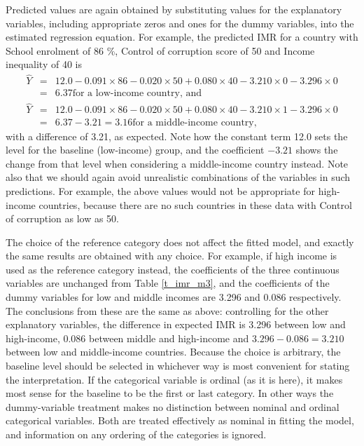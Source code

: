 Predicted values are again obtained by substituting values for the
explanatory variables, including appropriate zeros and ones for the
dummy variables, into the estimated regression equation. For example,
the predicted IMR for a country with
School enrolment of 86 \%,
Control of corruption score of 50 and
Income inequality of 40 is
\begin{eqnarray*}
\hat{Y}&=&12.0-0.091\times 86-0.020\times 50+0.080\times 40-3.210\times
0-3.296\times 0\\
&=&
6.37 \text{for a low-income country, and }\\
\hat{Y}&=&12.0-0.091\times 86-0.020\times 50+0.080\times 40-3.210\times
1-3.296\times 0\\
&=&
6.37-3.21=3.16 \text{for a middle-income country,}
\end{eqnarray*}
with a difference of 3.21, as expected. Note how the constant term 12.0
sets the level for the baseline (low-income) group, and the coefficient
$-3.21$ shows the change from that level when considering a middle-income
country instead. Note also that we should again avoid unrealistic
combinations of the variables in such predictions. For example, the
above values would not be appropriate for high-income countries,
because there are no such countries in these data
with Control of corruption as low as
50.

The choice of the reference category does not affect the fitted model,
and exactly the same results are obtained with any choice. For example,
if high income is used as the reference category instead, the coefficients
of the three continuous variables are unchanged from Table
\ref{t_imr_m3}, and the coefficients of the dummy variables for low and
middle incomes are 3.296 and 0.086 respectively. The conclusions
from these are the same as above: controlling for the other explanatory
variables, the difference in expected IMR is 3.296 between low
and high-income, 0.086 between middle and high-income and
$3.296-0.086=3.210$ between low and middle-income countries. Because the
choice is arbitrary, the baseline level  should be selected in whichever
way is most convenient for stating the interpretation. If the
categorical variable is ordinal (as it is here), it makes most sense for
the baseline to be the first or last category. In other ways the
dummy-variable treatment makes no distinction between nominal and
ordinal categorical variables. Both are treated effectively as nominal
in fitting the model, and information on any ordering of the categories
is ignored.

